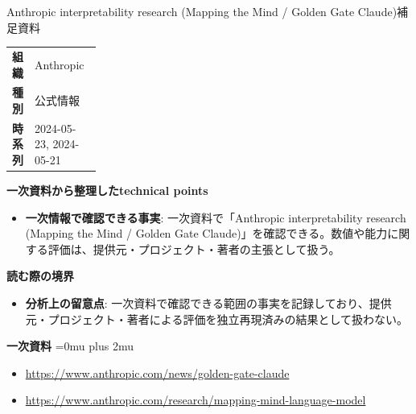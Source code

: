 \begin{technicalnote}{Anthropic interpretability research (Mapping the Mind / Golden Gate Claude)}{補足資料}
\begingroup
\begin{tabularx}{\linewidth}{@{}>{\bfseries}p{0.22\linewidth}X@{}}
組織 & Anthropic \\
種別 & 公式情報 \\
時系列 & 2024-05-23, 2024-05-21 \\
\end{tabularx}
\smallskip
{\bfseries 一次資料から整理したtechnical points}
\begin{itemize}[leftmargin=1.5em,itemsep=0.35em]
\item \textbf{一次情報で確認できる事実}: 一次資料で「Anthropic interpretability research (Mapping the Mind / Golden Gate Claude)」を確認できる。数値や能力に関する評価は、提供元・プロジェクト・著者の主張として扱う。
\end{itemize}
\begin{minipage}{\linewidth}
{\bfseries 読む際の境界}
\begin{itemize}[leftmargin=1.5em,itemsep=0.35em]
\item \textbf{分析上の留意点}: 一次資料で確認できる範囲の事実を記録しており、提供元・プロジェクト・著者による評価を独立再現済みの結果として扱わない。
\end{itemize}
\begin{samepage}
{\bfseries 一次資料}
\begingroup\sloppy
\Urlmuskip=0mu plus 2mu\relax
\begin{itemize}[leftmargin=1.5em,itemsep=0.25em]
\item {\scriptsize\url{https://www.anthropic.com/news/golden-gate-claude}}
\item {\scriptsize\url{https://www.anthropic.com/research/mapping-mind-language-model}}
\end{itemize}
\endgroup
\end{samepage}
\end{minipage}
\endgroup
\end{technicalnote}
\medskip

